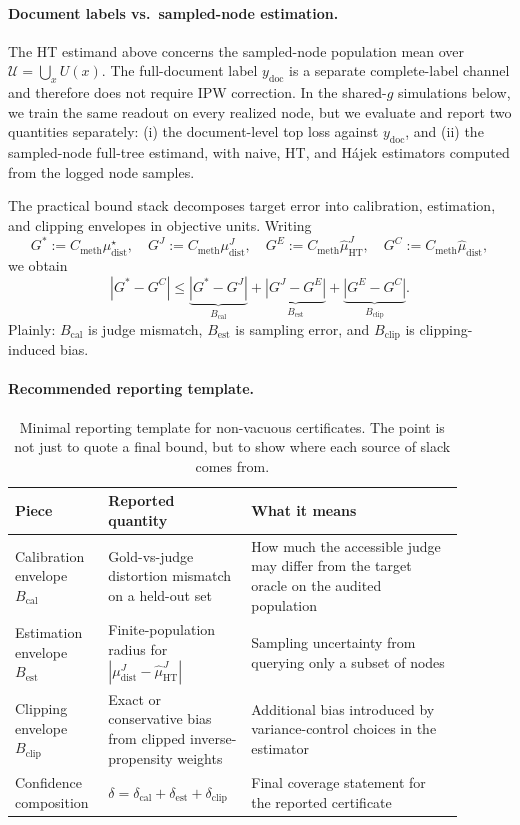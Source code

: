 \paragraph{Document labels vs.\ sampled-node estimation.}
The HT estimand above concerns the sampled-node population mean over $\mathcal{U}=\bigcup_x U(x)$. The full-document label $y_{\mathrm{doc}}$ is a separate complete-label channel and therefore does not require IPW correction. In the shared-$g$ simulations below, we train the same readout on every realized node, but we evaluate and report two quantities separately: (i) the document-level top loss against $y_{\mathrm{doc}}$, and (ii) the sampled-node full-tree estimand, with naive, HT, and H\'ajek estimators computed from the logged node samples.

The practical bound stack decomposes target error into calibration, estimation, and clipping envelopes in objective units. Writing
\[
G^\ast := C_{\mathrm{meth}}\mu_{\mathrm{dist}}^{\star},\quad
G^J := C_{\mathrm{meth}}\mu_{\mathrm{dist}}^{J},\quad
G^E := C_{\mathrm{meth}}\hat{\mu}_{\mathrm{HT}}^{J},\quad
G^C := C_{\mathrm{meth}}\hat{\mu}_{\mathrm{dist}},
\]
we obtain
\[
|G^\ast-G^C| \le \underbrace{|G^\ast-G^J|}_{B_{\mathrm{cal}}} + \underbrace{|G^J-G^E|}_{B_{\mathrm{est}}} + \underbrace{|G^E-G^C|}_{B_{\mathrm{clip}}}.
\]
Plainly: $B_{\mathrm{cal}}$ is judge mismatch, $B_{\mathrm{est}}$ is sampling error, and $B_{\mathrm{clip}}$ is clipping-induced bias.

\paragraph{Recommended reporting template.}
\begin{table}[t]
\centering\small
\begin{tabular}{p{0.17\linewidth}p{0.28\linewidth}p{0.44\linewidth}}
\toprule
Piece & Reported quantity & What it means \\
\midrule
Calibration envelope $B_{\mathrm{cal}}$ & Gold-vs-judge distortion mismatch on a held-out set & How much the accessible judge may differ from the target oracle on the audited population \\
Estimation envelope $B_{\mathrm{est}}$ & Finite-population radius for $|\mu_{\mathrm{dist}}^{J}-\hat{\mu}_{\mathrm{HT}}^{J}|$ & Sampling uncertainty from querying only a subset of nodes \\
Clipping envelope $B_{\mathrm{clip}}$ & Exact or conservative bias from clipped inverse-propensity weights & Additional bias introduced by variance-control choices in the estimator \\
Confidence composition & $\delta=\delta_{\mathrm{cal}}+\delta_{\mathrm{est}}+\delta_{\mathrm{clip}}$ & Final coverage statement for the reported certificate \\
\bottomrule
\end{tabular}
\caption{Minimal reporting template for non-vacuous certificates. The point is not just to quote a final bound, but to show where each source of slack comes from.}
\label{tab:reporting-template}
\end{table}

